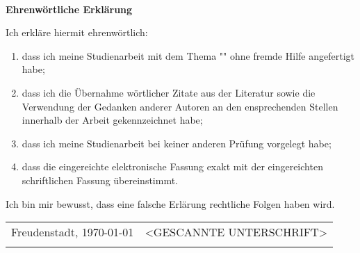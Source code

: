 
~

\vspace{17.1mm}

\begin{flushleft}
    \textbf{\huge{}Ehrenwörtliche Erklärung}{\huge\par}
\par\end{flushleft}

Ich erkläre hiermit ehrenwörtlich:

\begin{enumerate}
    \item dass ich meine Studienarbeit mit dem Thema "" ohne fremde Hilfe angefertigt habe;
    \item dass ich die Übernahme wörtlicher Zitate aus der Literatur sowie die Verwendung der Gedanken anderer Autoren an den ensprechenden Stellen innerhalb der Arbeit gekennzeichnet habe;
    \item dass ich meine Studienarbeit bei keiner anderen Prüfung vorgelegt habe;
    \item dass die eingereichte elektronische Fassung exakt mit der eingereichten schriftlichen Fassung  übereinstimmt.
\end{enumerate}

Ich bin mir bewusst, dass eine falsche Erlärung rechtliche Folgen haben wird.


\vspace{2cm}

\begin{center}
    \begin{tabular*}{\textwidth}{@{\extracolsep{\fill}}cl}
        Freudenstadt, \today & <GESCANNTE UNTERSCHRIFT>
        \tabularnewline
        & \author{}
        \tabularnewline
    \end{tabular*}
    \par
\end{center}
